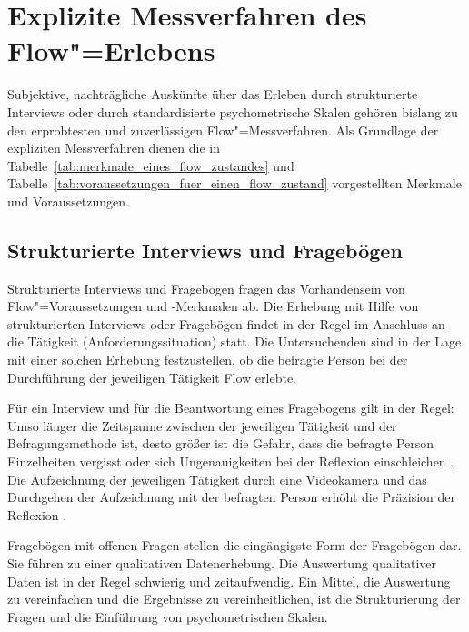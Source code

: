 

\section{Explizite Messverfahren des Flow"=Erlebens} 

\label{sec:explizite_messverfahren_des_flow_erlebens}

Subjektive, nachträgliche Auskünfte über das Erleben durch strukturierte Interviews oder durch standardisierte psychometrische Skalen gehören bislang zu den erprobtesten und zuverlässigen Flow"=Messverfahren. Als Grundlage der expliziten Messverfahren dienen die in Tabelle~\ref{tab:merkmale_eines_flow_zustandes} und Tabelle~\ref{tab:voraussetzungen_fuer_einen_flow_zustand} vorgestellten Merkmale und Voraussetzungen.

\subsection{Strukturierte Interviews und Fragebögen} 

\label{sub:strukturierte_interviews_und_fragebogen}

Strukturierte Interviews und Fragebögen fragen das Vorhandensein von Flow"=Voraussetzungen und -Merkmalen ab. Die Erhebung mit Hilfe von strukturierten Interviews oder Fragebögen findet in der Regel im Anschluss an die Tätigkeit (Anforderungssituation) statt. Die Untersuchenden sind in der Lage mit einer solchen Erhebung festzustellen, ob die befragte Person bei der Durchführung der jeweiligen Tätigkeit Flow erlebte.

Für ein Interview und für die Beantwortung eines Fragebogens gilt in der Regel: Umso länger die Zeitspanne zwischen der jeweiligen Tätigkeit und der Befragungsmethode ist, desto größer ist die Gefahr, dass die befragte Person Einzelheiten vergisst oder sich Ungenauigkeiten bei der Reflexion einschleichen \citep[][S.~87]{Henk2014}. Die Aufzeichnung der jeweiligen Tätigkeit durch eine Videokamera und das Durchgehen der Aufzeichnung mit der befragten Person erhöht die Präzision der Reflexion \citep[Video"=Recall,][S.~566]{Leuchter2006}.

Fragebögen mit offenen Fragen stellen die eingängigste Form der Fragebögen dar. Sie führen zu einer qualitativen Datenerhebung. Die Auswertung qualitativer Daten ist in der Regel schwierig und zeitaufwendig. Ein Mittel, die Auswertung zu vereinfachen und die Ergebnisse zu vereinheitlichen, ist die Strukturierung der Fragen und die Einführung von psychometrischen Skalen.

